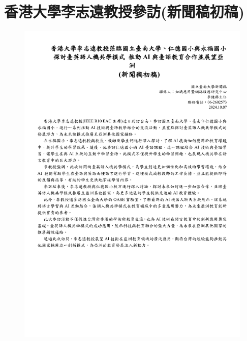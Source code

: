 \chapter{香港大學李志遠教授參訪(新聞稿初稿)} \label{appendix:HKUni}
\begin{figure}[htbp!]
    \centering
    \includegraphics[scale=0.62]{images/w5/香港大學李志遠教授參訪(新聞稿初稿)-10072024-1.pdf}
\end{figure}


